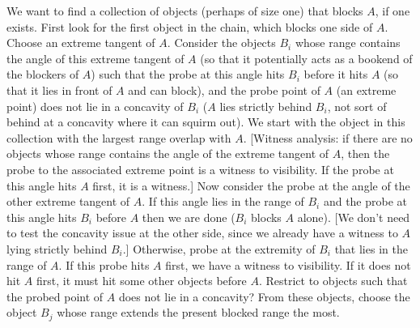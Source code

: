 \documentclass[12pt]{article}
\begin{document}
We want to find a collection of objects (perhaps of size one) that blocks $A$,
if one exists.
First look for the first object in the chain, which blocks one side of $A$.
Choose an extreme tangent of $A$.
Consider the objects $B_i$ whose range contains the angle of this extreme tangent of $A$
(so that it potentially acts as a bookend of the blockers of $A$)
such that the probe at this angle hits $B_i$ before it hits $A$
(so that it lies in front of $A$ and can block),
and the probe point of $A$ (an extreme point) does not lie in a concavity of $B_i$
($A$ lies strictly behind $B_i$, not sort of behind at a concavity where it can 
squirm out).
We start with the object in this collection with the largest range overlap with $A$.
[Witness analysis: if there are no objects whose range contains the angle of the
extreme tangent of $A$, then the probe to the associated extreme point is a witness
to visibility.
If the probe at this angle hits $A$ first, it is a witness.]
Now consider the probe at the angle of the other extreme tangent of $A$.
If this angle lies in the range of $B_i$ and the probe at this angle hits $B_i$ before $A$
then we are done ($B_i$ blocks $A$ alone).
[We don't need to test the concavity issue at the other side, since we already have
a witness to $A$ lying strictly behind $B_i$.]
Otherwise, probe at the extremity of $B_i$ that lies in the range of $A$.
If this probe hits $A$ first, we have a witness to visibility.
If it does not hit $A$ first, it must hit some other objects before $A$.
Restrict to objects such that the probed point of $A$ does not lie in a concavity?
From these objects, choose the object $B_j$ whose range extends the present blocked
range the most.




\end{document}
